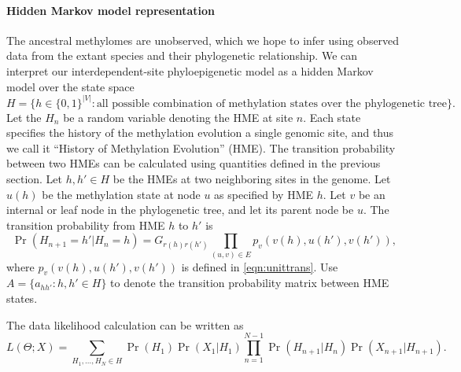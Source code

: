 \documentclass[11pt]{article}
\theoremstyle{theorem}
\theoremstyle{proposition}
\begin{document}
\paragraph{Hidden Markov model representation}
The ancestral methylomes are unobserved, which we hope to infer using
observed data from the extant species and their phylogenetic
relationship. We can interpret our interdependent-site phyloepigenetic
model as a hidden Markov model over the state space
\[
H=\{h\in\{0,1\}^{|V|}: \text{all possible combination of
methylation states over the phylogenetic tree} \}.
\]
Let the $H_n$ be a random variable denoting the HME at site $n$.  Each
state specifies the history of the methylation evolution a single
genomic site, and thus we call it ``History of Methylation Evolution''
(HME). The transition probability between two HMEs can be calculated
using quantities defined in the previous section. Let $h, h' \in H$ be
the HMEs at two neighboring sites in the genome. Let $u(h)$ be the
methylation state at node $u$ as specified by HME $h$. Let $v$ be an
internal or leaf node in the phylogenetic tree, and let its parent
node be $u$. The transition probability from HME $h$ to $h'$ is
\begin{equation}
\Pr(H_{n+1} = h'|H_n=h) = G_{r(h)r(h')}\prod_{(u,v)\in E}p_v(v(h),u(h'),v(h')),
\end{equation}\label{eqn:deftrans}
where $p_v(v(h),u(h'),v(h'))$ is defined in \eqref{eqn:unittrans}. Use
$A=\{a_{hh'}: h,h'\in H \}$ to denote the transition probability
matrix between HME states.

The data likelihood calculation can be written as
\begin{equation}
L(\Theta; X) = \sum_{H_1,\ldots, H_N\in H} \Pr(H_1)\Pr(X_1|H_1)\prod_{n=1}^{N-1} \Pr(H_{n+1}| H_{n})\Pr(X_{n+1}|H_{n+1}).
\end{equation}\label{L}
\end{document}
